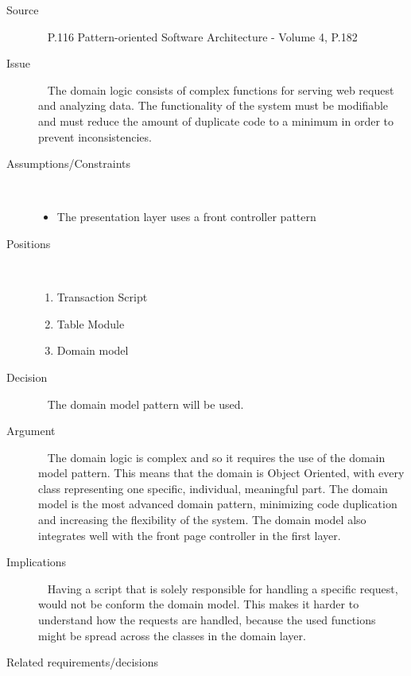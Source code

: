 \begin{description}
\item [Source]~
\EAA  \cite{Fowler:2002:PEA:579257} P.116
Pattern-oriented Software Architecture - Volume 4, P.182 \cite{wiley-4}

\item [Issue]~
The domain logic consists of complex functions for serving web request and analyzing data. The functionality of the system must be modifiable and must reduce the amount of duplicate code to a minimum in order to prevent inconsistencies.

\item [Assumptions/Constraints]~
\begin{itemize}
\item The presentation layer uses a front controller pattern
\end{itemize}

\item [Positions]~
\begin{enumerate}
\item Transaction Script
\item Table Module
\item Domain model
\end{enumerate}

\item [Decision] ~
The domain model pattern will be used.

\item [Argument]~
The domain logic is complex and so it requires the use of the domain model pattern. This means that the domain is Object Oriented, with every class representing one specific, individual, meaningful part. The domain model is the most advanced domain pattern, minimizing code duplication and increasing the flexibility of the system. The domain model also integrates well with the front page controller in the first layer.

\item [Implications]~
Having a script that is solely responsible for handling a specific request, would not be conform the domain model. This makes it harder to understand how the requests are handled, because the used functions might be spread across the classes in the domain layer.

\item [Related requirements/decisions]~\\
\cite{fr:4} \cite{fr:5} \cite{fr:6}  \cite{fr:15} \cite{fr:17} \cite{kd:3}
 
%
\end{description}


